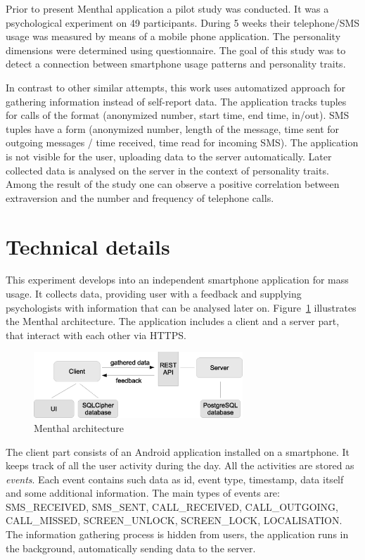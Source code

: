 Prior to present Menthal application a pilot study was conducted. 
It was a psychological experiment on 49 participants.
During 5 weeks their telephone/SMS usage was measured by means of a mobile phone application.
The personality dimensions were determined using questionnaire.
The goal of this study was to detect a connection between smartphone usage patterns and personality traits.

In contrast to other similar attempts, this work uses automatized approach for gathering information instead of self-report data.
The application tracks tuples for calls of the format (anonymized number, start time, end time, in/out).
SMS tuples have a form (anonymized number, length of the message, time sent for outgoing messages / time received, time read for incoming SMS).
The application is not visible for the user, uploading data to the server automatically.
Later collected data is analysed on the server in the context of personality traits.
Among the result of the study one can observe a positive correlation between extraversion and the number and frequency of telephone calls.

\section{Technical details}
This experiment develops into an independent smartphone application for mass usage. 
It collects data, providing user with a feedback and supplying psychologists with information that can be analysed later on.
Figure~\ref{fig:menthal_architecture} illustrates the Menthal architecture.
The application includes a client and a server part, that interact with each other via HTTPS.

\begin{figure}[h]
  \centering
  \includegraphics [width=0.7\textwidth]{images/Menthal_architecture}
  \caption{Menthal architecture}
  \label{fig:menthal_architecture}
\end{figure}

The client part consists of an Android application installed on a smartphone.
It keeps track of all the user activity during the day.
All the activities are stored as \textit{events}.
Each event contains such data as id, event type, timestamp, data itself and some additional information.
The main types of events are: SMS\_RECEIVED, SMS\_SENT, CALL\_RECEIVED, CALL\_OUTGOING, CALL\_MISSED, SCREEN\_UNLOCK, SCREEN\_LOCK, LOCALISATION.
The information gathering process is hidden from users, the application runs in the background, automatically sending data to the server.

